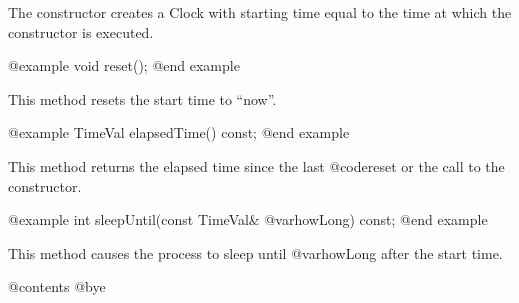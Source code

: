 The constructor creates a Clock with starting time equal to the
time at which the constructor is executed.

@example
void reset();
@end example

This method resets the start time to ``now''.

@example
TimeVal elapsedTime() const;
@end example

This method returns the elapsed time since the last @code{reset} or
the call to the constructor.

@example
int sleepUntil(const TimeVal& @var{howLong}) const;
@end example

This method causes the process to sleep until @var{howLong} after the
start time.

@contents
@bye
